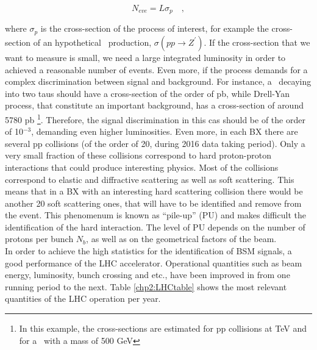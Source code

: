 \begin{equation}
 N_{eve} = L \sigma_{p}\quad,
\end{equation}

where $\sigma_{p}$ is the cross-section of the process of interest,
for example the cross-section of an hypothetical \Zprime~production, 
$\sigma(pp \rightarrow Z^{\prime})$. If the cross-section that
we want to measure is small, we need a large integrated luminosity
in order to achieved a reasonable number of events. Even more, if the process
demands for a complex discrimination between signal and background. For instance, a 
\Zprime~decaying into two taus should have a cross-section of the order of pb, while 
Drell-Yan process, that constitute an important background, has a 
cross-section of around 5780 pb \footnote{In this example, the cross-sections
are estimated for pp collisions at  TeV and for a \Zprime~with a mass of 500 GeV}.
Therefore, the signal discrimination in this cas should be of the order of 10$^{-3}$,
demanding even higher luminosities. Even more, in each BX there are several pp
 collisions (of the order of 20, during 2016 data taking period). Only a very small 
 fraction of these collisions correspond to hard proton-proton interactions that could produce
 interesting physics. Most of the collisions correspond to elastic and diffractive scattering
 as well as soft scattering. This means that in a BX with an interesting hard 
 scattering collision there would be another 20 soft scattering ones, that will have to be 
 identified and remove from the event. This phenomenum is known as “pile-up” 
 (PU) and makes difficult the identification of the hard interaction. The level 
 of PU depends on the number of protons per bunch $N_{b}$, as well as on the geometrical 
 factors of the beam. \\
 
 In order to achieve the high statistics for the identification of BSM signals, a good performance 
 of the LHC accelerator. Operational quantities such as beam energy, luminosity, bunch crossing and etc., 
 have been improved in from one running period to the next. Table \ref{chp2:LHCtable}
 shows the most relevant quantities of the LHC operation per year.
 
